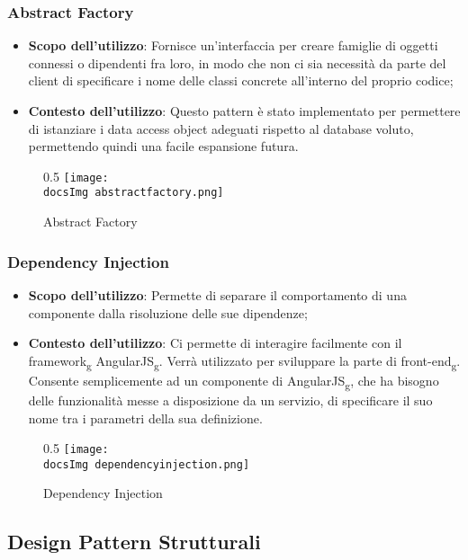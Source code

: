 		\subsubsection{Abstract Factory }
		\begin{itemize}\itemsep1pt
			\item \textbf{Scopo dell'utilizzo}: Fornisce un'interfaccia per creare famiglie di oggetti connessi o dipendenti fra loro, in modo che non ci sia necessità da parte del client di specificare i nome delle classi concrete all'interno del proprio codice;
			\item \textbf{Contesto dell'utilizzo}: Questo pattern è stato implementato per permettere di istanziare i data access object adeguati rispetto al database voluto, permettendo quindi una facile espansione futura. 
		\end{itemize}
		\begin{figure}[h]{0.5}
			\centering
			\texttt{[image: \\docsImg abstractfactory.png]}
			\caption{Abstract Factory}
			\label{fig. Abstract Factory}
		\end{figure}
		
		\subsubsection{Dependency Injection}
		\begin{itemize}\itemsep1pt
			\item\textbf{Scopo dell'utilizzo}: Permette di separare il comportamento di una componente dalla risoluzione delle sue dipendenze;
			\item\textbf{Contesto dell'utilizzo}: Ci permette di interagire facilmente con il framework\textsubscript{g} AngularJS\textsubscript{g}. Verrà utilizzato per sviluppare la parte di front-end\textsubscript{g}. Consente semplicemente ad un componente di AngularJS\textsubscript{g}, che ha bisogno delle funzionalità messe a disposizione da un servizio, di specificare il suo nome tra i parametri della sua definizione.
		\end{itemize}
		\begin{figure}[h]{0.5}
			\centering
			\texttt{[image: \\docsImg dependencyinjection.png]}
			\caption{Dependency Injection}
			\label{fig. Dependency Injection}
		\end{figure}

	\subsection{Design Pattern Strutturali}

